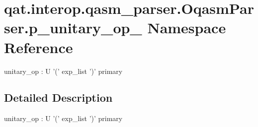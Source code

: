 \hypertarget{namespaceqat_1_1interop_1_1qasm__parser_1_1OqasmParser_1_1p__unitary__op__2}{\section{qat.\-interop.\-qasm\-\_\-parser.\-Oqasm\-Parser.\-p\-\_\-unitary\-\_\-op\-\_ Namespace Reference}
\label{namespaceqat_1_1interop_1_1qasm__parser_1_1OqasmParser_1_1p__unitary__op__2}
}


unitary\-\_\-op \-: U '(' exp\-\_\-list ')' primary  




\subsection{Detailed Description}
unitary\-\_\-op \-: U '(' exp\-\_\-list ')' primary 